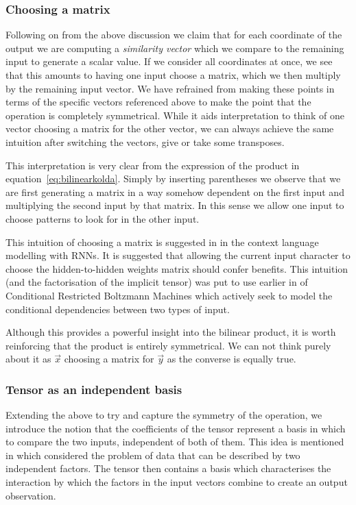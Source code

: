 \subsubsection{Choosing a matrix}
Following on from the above discussion we claim that for each coordinate of the output we are
computing a \emph{similarity vector} which we compare to the remaining input to generate a
scalar value. If we consider all coordinates at once, we see that this amounts to having
one input choose a matrix, which we then multiply by the remaining input vector. We have
refrained from making these points in terms of the specific vectors referenced above to make
the point that the operation is completely symmetrical. While it aids interpretation to think
of one vector choosing a matrix for the other vector, we can always achieve the same
intuition after switching the vectors, give or take some transposes.

This interpretation is very clear from the expression of the product in
equation~\eqref{eq:bilinearkolda}. Simply by inserting parentheses we observe that we are
first generating a matrix in a way somehow dependent on the first input and multiplying
the second input by that matrix. In this sense we allow one input to choose patterns to look for
in the other input.

This intuition of choosing a matrix is suggested in \autocite{Sutskever2013} in the
context language modelling with RNNs. It is suggested that allowing the current input
character to choose the hidden-to-hidden weights matrix should confer benefits. 
This intuition (and the factorisation of the implicit tensor) was put to use earlier in
of Conditional Restricted Boltzmann Machines \autocite{Taylor} which actively seek to model the
conditional dependencies between two types of input.

Although this provides a powerful insight into the bilinear product, it is worth reinforcing that
the product is entirely symmetrical. We can not think purely about it as \(\vec{x}\) choosing a matrix
for \(\vec{y}\) as the converse is equally true.

\subsubsection{Tensor as an independent basis}
Extending the above to try and capture the symmetry of the operation, we introduce
the notion that the coefficients of the tensor represent a basis in which to compare the
two inputs, independent of both of them. This idea is mentioned in
 \autocite{Tenenbaum2000} which considered the problem of data that can be described by two
independent factors.
The tensor then contains a basis which characterises the interaction by which the factors
in the input vectors combine to create an output observation.

